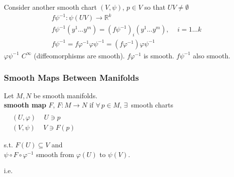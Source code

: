 Consider another smooth chart $(V,\psi)$, $p\in V$ so that $UV \neq \emptyset$
\[
\begin{gathered}
  f\psi^{-1} : \psi(UV) \to \mathbb{R}^k \\ 
  f\psi^{-1}(y^1 \dots y^m ) = (f\psi^{-1})_i(y^1 \dots y^m) , \quad \, i = 1\dots k \\
  f\psi^{-1} = f\varphi^{-1}\varphi \psi^{-1} = (f\varphi^{-1}) \varphi \psi^{-1}
\end{gathered}
\]
$\varphi \psi^{-1}$ $C^{\infty}$ (diffeomorphisms are smooth).  $f\varphi^{-1}$ is smooth.  $f\psi^{-1}$ also smooth.  

\subsubsection*{Smooth Maps Between Manifolds}

\begin{definition}
  Let $M,N$ be smooth manifolds.  \\
  \textbf{smooth map } $F$, $F:M \to N$ if $\forall \, p \in M$, $\exists \, $ smooth charts $\begin{aligned} & \quad \\
    & (U,\varphi) \quad \, U \ni p \\
    & (V,\psi) \quad \, V \ni F(p) \end{aligned}$

s.t. $F(U) \subseteq V$ and \\
\phantom{s.t. } $\psi \circ F \circ \varphi^{-1}$ smooth from $\varphi(U)$ to $\psi(V)$.  
\end{definition}

i.e. 





